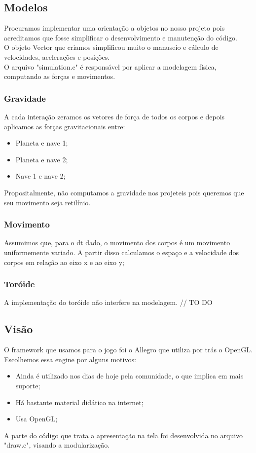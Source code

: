 \documentclass{article}
\begin{document}
\subsection{Modelos}
Procuramos implementar uma orientação a objetos no nosso projeto pois acreditamos que fosse simplificar o desenvolvimento e manutenção do
código. \\
 O objeto Vector que criamos simplificou muito o manuseio e cálculo de velocidades, acelerações e posições. \\
O arquivo "simulation.c" é responsável por aplicar a modelagem física, computando as forças e movimentos.
\subsubsection{Gravidade}
A cada interação zeramos os vetores de força de todos os corpos e depois aplicamos as forças gravitacionais entre:
\begin{itemize}
\item Planeta e nave 1;
\item  Planeta e nave 2;
\item Nave 1 e nave 2;
\end{itemize}
Propositalmente, não computamos a gravidade nos projeteis pois queremos que seu movimento seja retilínio.

\subsubsection{Movimento}
Assumimos que, para o dt dado, o movimento dos corpos é um movimento uniformemente variado. A partir disso calculamos o espaço e a velocidade dos corpos em relação ao eixo x e ao eixo y;

\subsubsection{Toróide}
A implementação do toróide não interfere na modelagem. // TO DO

\subsection{Visão}
O framework que usamos para o jogo foi o Allegro que utiliza por trás o
OpenGL. Escolhemos essa engine por alguns motivos: \\
\begin{itemize}
    \item Ainda é utilizado nos dias de hoje pela comunidade, o que implica em mais suporte;
    \item Há bastante material didático na internet;
    \item Usa OpenGL;
\end{itemize}
A parte do código que trata a apresentação na tela foi desenvolvida no arquivo "draw.c", visando a modularização.
\end{document}

